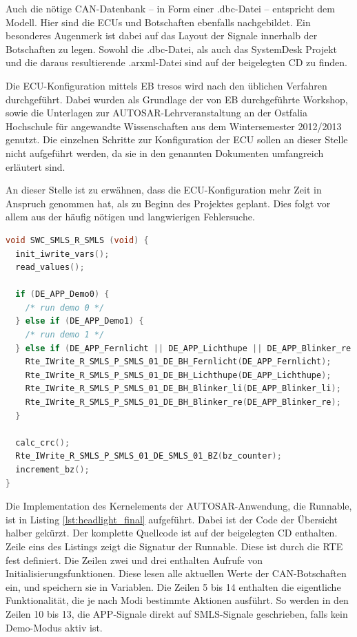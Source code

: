 \documentclass[
  a4paper,					    %
  twoside,
  DIV=calc,     				%
  bibliography=totoc,
  cleardoublepage=empty,
  ngerman,     					%
  final       					%
]{scrbook}
\begin{document}
Auch die nötige CAN-Datenbank -- in Form einer .dbc-Datei -- entspricht dem Modell. Hier sind die ECUs und Botschaften ebenfalls nachgebildet. Ein besonderes Augenmerk ist dabei auf das Layout der Signale innerhalb der Botschaften zu legen. Sowohl die .dbc-Datei, als auch das SystemDesk Projekt und die daraus resultierende .arxml-Datei sind auf der beigelegten CD zu finden.

Die ECU-Konfiguration mittels EB tresos wird nach den üblichen Verfahren durchgeführt. Dabei wurden als Grundlage der von EB durchgeführte Workshop, sowie die Unterlagen zur AUTOSAR-Lehrveranstaltung an der Ostfalia Hochschule für angewandte Wissenschaften aus dem Wintersemester 2012/2013 genutzt. Die einzelnen Schritte zur Konfiguration der ECU sollen an dieser Stelle nicht aufgeführt werden, da sie in den genannten Dokumenten umfangreich erläutert sind. 

An dieser Stelle ist zu erwähnen, dass die ECU-Konfiguration mehr Zeit in Anspruch genommen hat, als zu Beginn des Projektes geplant. Dies folgt vor allem aus der häufig nötigen und langwierigen Fehlersuche. \\

\begin{lstlisting}[frame=single, language=C, basicstyle=\footnotesize, caption={Implementation der Runnable}, label={lst:headlight_final}]
void SWC_SMLS_R_SMLS (void) {
  init_iwrite_vars();
  read_values();

  if (DE_APP_Demo0) {
    /* run demo 0 */
  } else if (DE_APP_Demo1) {
    /* run demo 1 */
  } else if (DE_APP_Fernlicht || DE_APP_Lichthupe || DE_APP_Blinker_re || DE_APP_Blinker_li) {
    Rte_IWrite_R_SMLS_P_SMLS_01_DE_BH_Fernlicht(DE_APP_Fernlicht);
    Rte_IWrite_R_SMLS_P_SMLS_01_DE_BH_Lichthupe(DE_APP_Lichthupe);
    Rte_IWrite_R_SMLS_P_SMLS_01_DE_BH_Blinker_li(DE_APP_Blinker_li);
    Rte_IWrite_R_SMLS_P_SMLS_01_DE_BH_Blinker_re(DE_APP_Blinker_re);	
  }

  calc_crc();
  Rte_IWrite_R_SMLS_P_SMLS_01_DE_SMLS_01_BZ(bz_counter);
  increment_bz();	
}
\end{lstlisting}

Die Implementation des Kernelements der AUTOSAR-Anwendung, die Runnable, ist in Listing \ref{lst:headlight_final} aufgeführt. Dabei ist der Code der Übersicht halber gekürzt. Der komplette Quellcode ist auf der beigelegten CD enthalten. Zeile eins des Listings zeigt die Signatur der Runnable. Diese ist durch die RTE fest definiert. Die Zeilen zwei und drei enthalten Aufrufe von Initialisierungsfunktionen. Diese lesen alle aktuellen Werte der CAN-Botschaften ein, und speichern sie in Variablen. Die Zeilen 5 bis 14 enthalten die eigentliche Funktionalität, die je nach Modi bestimmte Aktionen ausführt. So werden in den Zeilen 10 bis 13, die APP-Signale direkt auf SMLS-Signale geschrieben, falls kein Demo-Modus aktiv ist.
\end{document}
